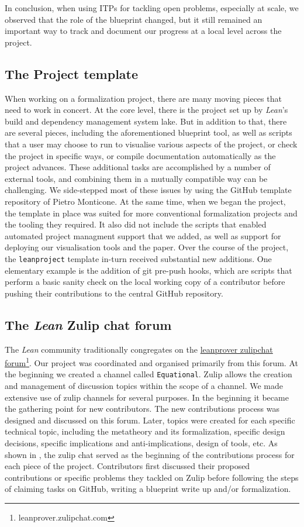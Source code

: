 In conclusion, when using ITPs for tackling open problems, especially at scale, we observed that the role of the blueprint changed, but it still remained an important way to track and document our progress at a local level across the project.

\subsection{The Project template}
When working on a formalization project, there are many moving pieces that need to work in concert. At the core level, there is the project set up by \emph{Lean}'s build and dependency management system lake. But in addition to that, there are several pieces, including the aforementioned blueprint tool, as well as scripts that a user may choose to run to visualise various aspects of the project, or check the project in specific ways, or compile documentation automatically as the project advances. These additional tasks are accomplished by a number of external tools, and combining them in a mutually compatible way can be challenging. We side-stepped most of these issues by using the GitHub template repository of Pietro Monticone\cite{Monticone_LeanProject_2025}. At the same time, when we began the project, the template in place was suited for more conventional formalization projects and the tooling they required. It also did not include the scripts that enabled automated project managment support that we added, as well as support for deploying our visualisation tools and the paper. Over the course of the project, the \texttt{leanproject} template in-turn received substantial new additions. One elementary example is the addition of git pre-push hooks, which are scripts that perform a basic sanity check on the local working copy of a contributor before pushing their contributions to the central GitHub repository.

\subsection{The  \emph{Lean} Zulip chat forum}
The \emph{Lean} community traditionally congregates on the \href{leanprover.zulipchat.com}{leanprover zulipchat forum}\footnote{leanprover.zulipchat.com}. Our project was coordinated and organised primarily from this forum. At the beginning we created a channel called \texttt{Equational}. Zulip allows the creation and management of discussion topics within the scope of a channel. We made extensive use of zulip channels for several purposes. In the beginning it became the gathering point for new contributors. The new contributions process was designed and discussed on this forum. Later, topics were created for each specific technical topic, including the metatheory and its formalization, specific design decisions, specific implications and anti-implications, design of tools, etc. As shown in , the zulip chat served as the beginning of the contributions process for each piece of the project. Contributors first discussed their proposed contributions or specific problems they tackled on Zulip before following the steps of claiming tasks on GitHub, writing a blueprint write up and/or formalization.

